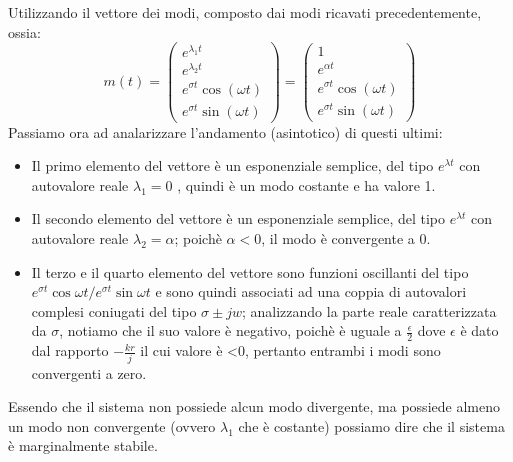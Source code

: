 Utilizzando il vettore dei modi, composto dai modi ricavati precedentemente, ossia:
\begin{displaymath}
m(t)=\left(\begin{array}{c}
e^{\lambda_{1}t}\\
e^{\lambda_{2}t}\\
e^{\sigma t}\cos(\omega t)\\
e^{\sigma t}\sin(\omega t)
\end{array}\right)=\left(\begin{array}{c}
1\\
e^{\alpha t} \\
e^{\sigma t}\cos(\omega t)\\
e^{\sigma t}\sin(\omega t)
\end{array}\right)
\end{displaymath}
Passiamo ora ad analarizzare l'andamento (asintotico) di questi ultimi:
\begin{itemize}
\item Il primo elemento del vettore è un esponenziale semplice, del tipo $e^{\lambda t}$ con autovalore reale $\lambda_1=0$ , quindi è un modo costante e ha valore 1.
\item Il secondo elemento del vettore è un esponenziale semplice, del tipo $e^{\lambda t}$ con autovalore reale $\lambda_2=\alpha$; poichè $\alpha<0$, il modo è convergente a 0.
\item Il terzo e il quarto elemento del vettore sono funzioni oscillanti del tipo $e^{\sigma t}\cos{\omega t} / e^{\sigma t}\sin{\omega t}$ e sono quindi associati ad una coppia di autovalori complesi coniugati del tipo $\sigma \pm jw$; analizzando la parte reale caratterizzata da $\sigma$, notiamo che il suo valore è negativo, poichè è uguale a $\frac{\epsilon}{2}$ dove $\epsilon$ è dato dal rapporto $-\frac{kr}{j}$ il cui valore è <0, pertanto entrambi i modi sono convergenti a zero. 
\end{itemize}
Essendo che il sistema non possiede alcun modo divergente, ma possiede almeno un modo non convergente (ovvero $\lambda_1$ che è costante) possiamo dire che il sistema è marginalmente stabile.